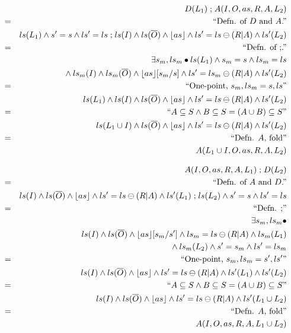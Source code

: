 \begin{eqnarray*}
  && D(L_1) \mathrel{;} A(I,O,as,R,A,L_2)
\\&=&\textrm{``Defn. of $D$ and $A$.''}
\\&& ls(L_1) \land s'=s \land ls'=ls
     \mathrel{;}
     ls(I) \land ls(\overline{O}) \land \lfloor as\rfloor \land ls'=ls\ominus(R|A) \land ls'(L_2)
\\&=&\textrm{``Defn. of $\mathrel{;}$.''}
\\&& \exists s_m,ls_m \bullet ls(L_1) \land s_m=s \land ls_m=ls
\\&& \qquad {} \land
     ls_m(I) \land ls_m(\overline{O}) \land \lfloor as\rfloor[s_m/s]
     \land ls'=ls_m \ominus (R|A) \land ls'(L_2)
\\&=&\textrm{``One-point, $s_m,ls_m = s,ls$''}
\\&& ls(L_1) \land
     ls(I) \land ls(\overline{O}) \land \lfloor as\rfloor
     \land ls'=ls \ominus (R|A) \land ls'(L_2)
\\&=&\textrm{``$A \subseteq S \land B \subseteq S = (A \cup B) \subseteq S$''}
\\&& ls(L_1 \cup I) \land ls(\overline{O}) \land \lfloor as\rfloor
     \land ls'=ls \ominus (R|A) \land ls'(L_2)
\\&=&\textrm{``Defn. $A$, fold''}
\\&& A(L_1 \cup I,O,as,R,A,L_2)
\end{eqnarray*}

\begin{eqnarray*}
  && A(I,O,as,R,A,L_1) \mathrel{;} D(L_2)
\\&=&\textrm{``Defn. of $A$ and $D$.''}
\\&& ls(I) \land ls(\overline{O}) \land \lfloor as\rfloor \land ls'=ls\ominus(R|A) \land ls'(L_1)
     \mathrel{;}
     ls(L_2) \land s'=s \land ls'=ls
\\&=&\textrm{``Defn. $\mathrel{;}$''}
\\&& \exists s_m,ls_m \bullet
\\&& \quad
     ls(I) \land ls(\overline{O}) \land \lfloor as\rfloor[s_m/s']
     \land ls_m=ls \ominus (R|A) \land ls_m(L_1)
\\&& {} \land
     ls_m(L_2) \land s'=s_m \land ls'=ls_m
\\&=&\textrm{``One-point, $s_m,ls_m = s',ls'$''}
\\&& ls(I) \land ls(\overline{O}) \land \lfloor as\rfloor
\land ls'=ls \ominus (R|A) \land ls'(L_1)
     \land ls'(L_2)
\\&=&\textrm{``$A \subseteq S \land B \subseteq S = (A \cup B) \subseteq S$''}
\\&& ls(I) \land ls(\overline{O}) \land \lfloor as\rfloor \land ls'=ls \ominus (R|A)
     \land ls'(L_1 \cup L_2)
\\&=&\textrm{``Defn. $A$, fold''}
\\&& A(I,O,as,R,A,L_1 \cup L_2)
\end{eqnarray*}


